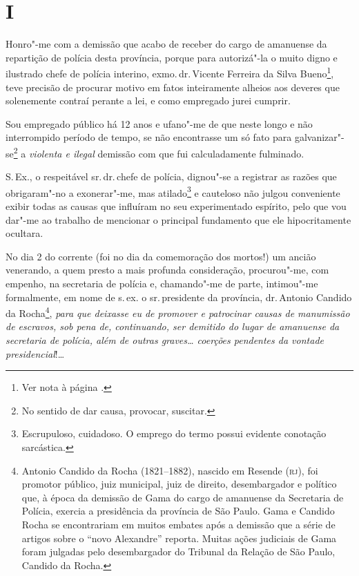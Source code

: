 \section*{I}

\noindent{}Honro"-me com a demissão que acabo de receber do cargo de amanuense da
repartição de polícia desta província, porque para autorizá"-la o muito
digno e ilustrado chefe de polícia interino, exmo.\,dr.\,Vicente Ferreira
da Silva Bueno\footnote{Ver nota à página \pageref{bueno}.}, teve
precisão de procurar motivo em fatos inteiramente alheios aos deveres
que solenemente contraí perante a lei, e como empregado jurei cumprir.

Sou empregado público há 12 anos e ufano"-me de que neste longo e não
interrompido período de tempo, se não encontrasse um só fato para
galvanizar"-se\footnote{No sentido de dar causa, provocar, suscitar.} a
\emph{violenta e ilegal} demissão com que fui calculadamente fulminado.

S.\,Ex., o respeitável sr.\,dr.\,chefe de polícia, dignou"-se a registrar as
razões que obrigaram"-no a exonerar"-me, mas atilado\footnote{
  Escrupuloso, cuidadoso. O emprego do termo possui evidente conotação
  sarcástica.} e cauteloso não julgou conveniente exibir todas as causas
que influíram no seu experimentado espírito, pelo que vou dar"-me ao
trabalho de mencionar o principal fundamento que ele hipocritamente
ocultara.

No dia 2 do corrente (foi no dia da comemoração dos mortos!) um ancião
venerando, a quem presto a mais profunda consideração, procurou"-me, com
empenho, na secretaria de polícia e, chamando"-me de parte, intimou"-me
formalmente, em nome de s.\,ex. o sr.\,presidente da província, dr.\,Antonio Candido da Rocha\footnote{Antonio Candido da Rocha
  (1821--1882), nascido em Resende (\textsc{rj}), foi promotor público, juiz
  municipal, juiz de direito, desembargador e político que, à época da
  demissão de Gama do cargo de amanuense da Secretaria de Polícia,
  exercia a presidência da província de São Paulo. Gama e Candido Rocha
  se encontrariam em muitos embates após a demissão que a série de
  artigos sobre o ``novo Alexandre'' reporta. Muitas ações judiciais de
  Gama foram julgadas pelo desembargador do Tribunal da Relação de São
  Paulo, Candido da Rocha.}, \emph{para que deixasse eu de promover e
patrocinar causas de manumissão de escravos, sob pena de, continuando,
ser demitido do lugar de amanuense da secretaria de polícia, além de
outras graves\ldots{} coerções pendentes da vontade presidencial}!\ldots{}

